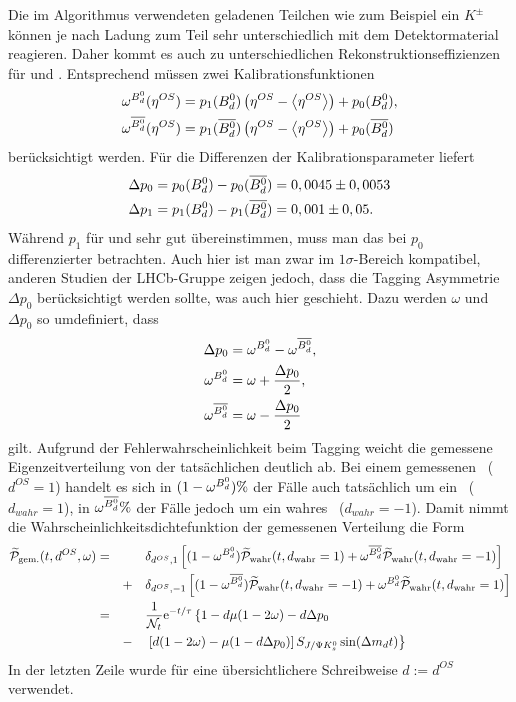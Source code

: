Die im Algorithmus verwendeten geladenen Teilchen wie zum Beispiel ein $K^{\pm}$ können je nach Ladung zum Teil sehr unterschiedlich mit dem Detektormaterial reagieren. Daher kommt es auch zu unterschiedlichen Rekonstruktionseffizienzen für \Bd und \Bdbar. Entsprechend müssen zwei Kalibrationsfunktionen 
\begin{align}
\omega^{\text{$B_d^0$}}(\eta^{OS}) &= p_1(\text{$B_d^0$})\left(\eta^{OS}-\left\langle \eta^{OS} \right\rangle\right) + p_0(\text{$B_d^0$}) , \\
\omega^{\text{$\overline{B_d^0}$}}(\eta^{OS}) &= p_1(\text{$\overline{B_d^0}$})\left(\eta^{OS}-\left\langle \eta^{OS} \right\rangle\right) + p_0(\text{$\overline{B_d^0}$})
\end{align}
berücksichtigt werden. Für die Differenzen der Kalibrationsparameter liefert \cite{tagging}
\begin{align}
\Delta p_0 &= p_0(\text{$B_d^0$}) - p_0(\text{$\overline{B_d^0}$}) = 0,0045 \pm 0,0053 \\
\Delta p_1 &= p_1(\text{$B_d^0$}) - p_1(\text{$\overline{B_d^0}$}) = 0,001 \pm 0,05 .
\end{align}
Während $p_1$ für \Bd und \Bdbar sehr gut übereinstimmen, muss man das bei $p_0$ differenzierter betrachten. Auch hier ist man zwar im $1\sigma$-Bereich kompatibel, anderen Studien der LHCb-Gruppe zeigen jedoch, dass die Tagging Asymmetrie $\Delta p_0$ berücksichtigt werden sollte, was auch hier geschieht. Dazu werden $\omega$ und $\Delta p_0$ so umdefiniert, dass
\begin{align}
\Delta p_0 &= \omega^{\text{$B_d^0$}} - \omega^{\text{$\overline{B_d^0}$}}, \\
\omega^{\text{$B_d^0$}} &= \omega + \frac{\Delta p_0}{2},  \\
\omega^{\text{$\overline{B_d^0}$}} &= \omega - \frac{\Delta p_0}{2}
\end{align}
gilt. Aufgrund der Fehlerwahrscheinlichkeit beim Tagging weicht die gemessene Eigenzeitverteilung von der tatsächlichen deutlich ab. Bei einem gemessenen \Bd\ ($d^{OS}=1$) handelt es sich in $(1-\omega^{\text{$B_d^0$}})\%$ der Fälle auch tatsächlich um ein \Bd\ ($d_{wahr}=1$), in $\omega^{\text{$\overline{B_d^0}$}}\%$ der Fälle jedoch um ein wahres \Bdbar\ ($d_{wahr}=-1$). Damit nimmt die Wahrscheinlichkeitsdichtefunktion der gemessenen Verteilung die Form
\begin{alignat}{3}
\nonumber\widetilde{\mathcal{P}}_{\text{gem.}}(t, d^{OS}, \omega) &= && &&\delta_{d^{OS},1} \left[(1-\omega^{\text{$B_d^0$}})\widetilde{\mathcal{P}}_{\text{wahr}}(t, d_{\text{wahr}}=1) + \omega^{\text{$\overline{B_d^0}$}}\widetilde{\mathcal{P}}_{\text{wahr}}(t, d_{\text{wahr}}=-1)\right]\\
\nonumber & && + &&\delta_{d^{OS},-1} \left[(1-\omega^{\text{$\overline{B_d^0}$}})\widetilde{\mathcal{P}}_{\text{wahr}}(t, d_{\text{wahr}}=-1) + \omega^{\text{$B_d^0$}}\widetilde{\mathcal{P}}_{\text{wahr}}(t, d_{\text{wahr}}=1)\right] \\
\nonumber &= && &&\frac{1}{\mathcal{N}_t}\mathrm{e}^{-t/\tau} \left\lbrace 1-d\mu(1-2\omega)-d\Delta p_0 \right. \\
& && - && \left.\left[d(1-2\omega)-\mu(1-d\Delta p_0)\right]S_{J/\Psi K_s^0}\sin(\Delta m_d t)\right\rbrace \label{eq:fit_pdf_vorlaeufig}
\end{alignat}
In der letzten Zeile wurde für eine übersichtlichere Schreibweise $d:=d^{OS}$ verwendet.

